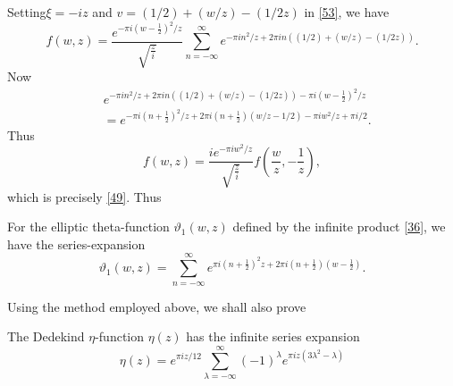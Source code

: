 Setting\pageoriginale $\xi=-iz$ and $v=(1/2)+(w/z)-(1/2z)$ in
\eqref{53}, we have
$$
f(w,z)=\frac{e^{-\pi
    i(w-\frac{1}{2})^{2}/z}}{\sqrt{\frac{z}{i}}}\sum^{\infty}_{n=-\infty}e^{-\pi
  in^{2}/z+2\pi in((1/2)+(w/z)-(1/2z))}.
$$
Now
\begin{align*}
& e^{-\pi in^{2}/z+2\pi in((1/2)+(w/z)-(1/2z))-\pi i(w-\frac{1}{2})^{2}/z}\\
& = e^{-\pi i(n+\frac{1}{2})^{2}/z+2\pi i(n+\frac{1}{2})(w/z-1/2)-\pi
    iw^{2}/z+\pi i/2}.
\end{align*}
Thus
$$
f(w,z)=\frac{ie^{-\pi
    iw^{2}/z}}{\sqrt{\frac{z}{i}}}f\left(\frac{w}{z},-\frac{1}{z}\right),
$$
which is precisely \eqref{49}. Thus

\begin{proposition}\label{prop5}
For the elliptic theta-function $\vartheta_{1}(w,z)$ defined by the
infinite product \eqref{36}, we have the series-expansion
$$
\vartheta_{1}(w,z)=\sum^{\infty}_{n=-\infty}e^{\pi
  i(n+\frac{1}{2})^{2}z+2\pi i(n+\frac{1}{2})(w-\frac{1}{2})}. 
$$
\end{proposition}

Using the method employed above, we shall also prove

\begin{proposition}\label{prop6}
The Dedekind $\eta$-function $\eta(z)$ has the infinite series
expansion
$$
\eta(z)=e^{\pi
  iz/12}\sum^{\infty}_{\lambda=-\infty}(-1)^{\lambda}e^{\pi
  iz(3\lambda^{2}-\lambda)} 
$$
\end{proposition}

